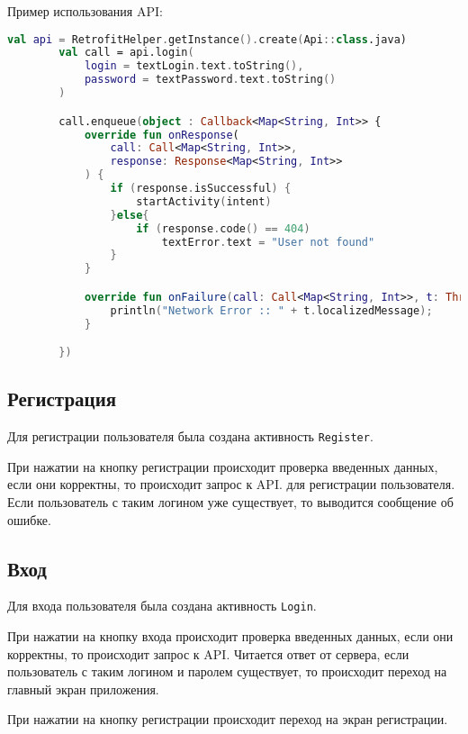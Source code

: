 Пример использования API:

\begin{lstlisting}[language=Kotlin, caption=\leftline{Пример использования API}, label=lst:ApiExample]
val api = RetrofitHelper.getInstance().create(Api::class.java)
        val call = api.login(
            login = textLogin.text.toString(),
            password = textPassword.text.toString()
        )

        call.enqueue(object : Callback<Map<String, Int>> {
            override fun onResponse(
                call: Call<Map<String, Int>>,
                response: Response<Map<String, Int>>
            ) {
                if (response.isSuccessful) {
                    startActivity(intent)
                }else{
                    if (response.code() == 404)
                        textError.text = "User not found"
                }
            }

            override fun onFailure(call: Call<Map<String, Int>>, t: Throwable) {
                println("Network Error :: " + t.localizedMessage);
            }

        })
\end{lstlisting}

\subsection{Регистрация}

Для регистрации пользователя была создана активность \texttt{Register}.

При нажатии на кнопку регистрации происходит проверка введенных данных, если они корректны, то происходит запрос к API.
для регистрации пользователя.
Если пользователь с таким логином уже существует, то выводится сообщение об ошибке.

\subsection{Вход}

Для входа пользователя была создана активность \texttt{Login}.


При нажатии на кнопку входа происходит проверка введенных данных, если они корректны, то происходит запрос к API.
Читается ответ от сервера, если пользователь с таким логином и паролем существует, то происходит переход на главный
экран приложения.

При нажатии на кнопку регистрации происходит переход на экран регистрации.

